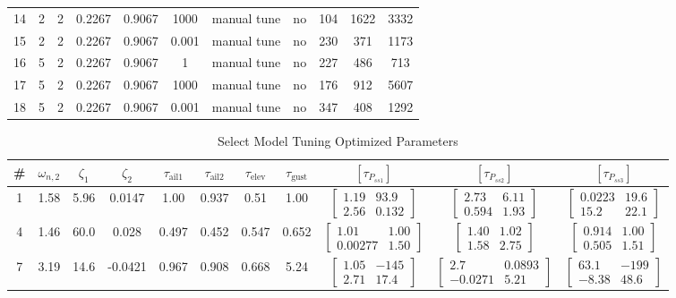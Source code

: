 \begin{landscape}
\begin{table}[h]
\begin{tabular}{ccccccccccc}
		14 & 2 & 2 & 0.2267 & 0.9067 & 1000  & manual tune   & no  & 104 & 1622 & 3332 \\
		15 & 2 & 2 & 0.2267 & 0.9067 & 0.001 & manual tune   & no  & 230 & 371  & 1173 \\
		16 & 5 & 2 & 0.2267 & 0.9067 & 1    & manual tune   & no  & 227 & 486  & 713 \\
		17 & 5 & 2 & 0.2267 & 0.9067 & 1000  & manual tune   & no  & 176 & 912  & 5607 \\
		18 & 5 & 2 & 0.2267 & 0.9067 & 0.001 & manual tune   & no  & 347 & 408  & 1292 \\
		\hline\hline
	\end{tabular}
\end{table}

\begin{table}[H]
	\centering
	\caption{Select Model Tuning Optimized Parameters}
	\label{tab:optVar}
	\begin{tabular}{ccccccccccc}
		\hline\hline
		\# & $\omega_{n,2}$ & $\zeta_1$ & $\zeta_2$ & $\tau_\text{ail1}$ & $\tau_\text{ail2}$ & $\tau_\text{elev}$ & $\tau_\text{gust}$ &
		$\left[\tau_{P_{ss1}}\right]$ & $\left[\tau_{P_{ss2}}\right]$ & $\left[\tau_{P_{ss3}}\right]$ \\
		\hline
		1  & 1.58 & 5.96 & 0.0147 & 1.00 & 0.937 & 0.51 & 1.00 & $\begin{bmatrix}1.19 & 93.9 \\ 2.56 & 0.132\end{bmatrix}$ & $\begin{bmatrix}2.73 & 6.11 \\ 0.594 & 1.93\end{bmatrix}$ & $\begin{bmatrix}0.0223 & 19.6 \\ 15.2 & 22.1 \end{bmatrix}$ \\
		4  & 1.46 & 60.0 & 0.028 & 0.497 & 0.452 & 0.547 & 0.652 & $\begin{bmatrix}1.01 & 1.00 \\ 0.00277 & 1.50\end{bmatrix}$ & $\begin{bmatrix}1.40 & 1.02 \\ 1.58 & 2.75\end{bmatrix}$ & $\begin{bmatrix}0.914 & 1.00 \\ 0.505 & 1.51\end{bmatrix}$ \\
		7  & 3.19 & 14.6 & -0.0421 & 0.967 & 0.908 & 0.668 & 5.24 & $\begin{bmatrix}1.05 & -145 \\ 2.71 & 17.4\end{bmatrix}$ & $\begin{bmatrix}2.7 & 0.0893 \\ -0.0271 & 5.21\end{bmatrix}$ & $\begin{bmatrix}63.1 & -199 \\ -8.38 & 48.6\end{bmatrix}$ \\

\end{tabular}
\end{table}
\end{landscape}
